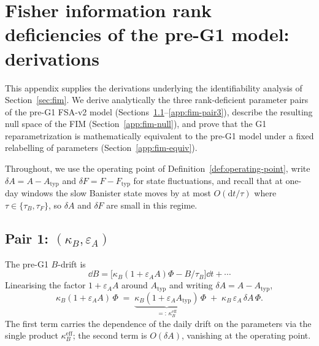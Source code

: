 \section{Fisher information rank deficiencies of the pre-G1 model: derivations}\label{app:fim}

This appendix supplies the derivations underlying the identifiability
analysis of Section~\ref{sec:fim}. We derive analytically the three
rank-deficient parameter pairs of the pre-G1 FSA-v2 model
(Sections~\ref{app:fim-pair1}--\ref{app:fim-pair3}), describe the
resulting null space of the FIM (Section~\ref{app:fim-null}), and
prove that the G1 reparametrization is mathematically equivalent to
the pre-G1 model under a fixed relabelling of parameters
(Section~\ref{app:fim-equiv}).

Throughout, we use the operating point of
Definition~\ref{def:operating-point}, write
$\delta A = A - A_{\mathrm{typ}}$ and $\delta F = F - F_{\mathrm{typ}}$
for state fluctuations, and recall that at one-day windows the slow
Banister state moves by at most $O(\mathrm{d}t/\tau)$ where
$\tau \in \{\tau_B, \tau_F\}$, so $\delta A$ and $\delta F$ are
small in this regime.

\subsection{Pair 1: \texorpdfstring{$(\kappa_B, \varepsilon_A)$}{(kappa\_B, epsilon\_A)}}\label{app:fim-pair1}

The pre-G1 $B$-drift is
\begin{equation*}
  \dd B = \bigl[\kappa_B(1+\varepsilon_A A)\Phi - B/\tau_B\bigr]\dd t + \cdots
\end{equation*}
Linearising the factor $1+\varepsilon_A A$ around $A_{\mathrm{typ}}$
and writing $\delta A = A - A_{\mathrm{typ}}$,
\begin{equation}
  \kappa_B(1+\varepsilon_A A)\,\Phi
   \;=\;
   \underbrace{\kappa_B(1+\varepsilon_A A_{\mathrm{typ}})}_{=:\,\kappa_B^{\mathrm{eff}}}\,\Phi
   \;+\; \kappa_B\,\varepsilon_A\,\delta A\,\Phi.
  \label{eq:pair1-expand}
\end{equation}
The first term carries the dependence of the daily drift on the
parameters via the single product $\kappa_B^{\mathrm{eff}}$; the
second term is $O(\delta A)$, vanishing at the operating point.


